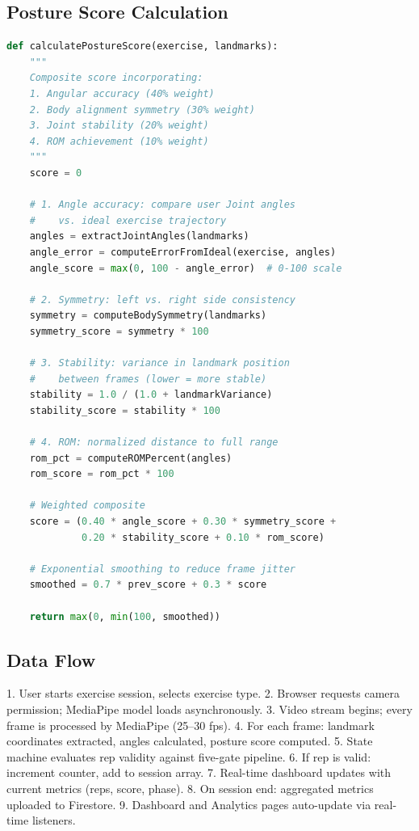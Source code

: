 \documentclass[12pt,a4paper]{article}
\begin{document}
\subsection{Posture Score Calculation}

\begin{lstlisting}[language=Python, caption={Posture score multi-factor algorithm}]
def calculatePostureScore(exercise, landmarks):
    """
    Composite score incorporating:
    1. Angular accuracy (40% weight)
    2. Body alignment symmetry (30% weight)  
    3. Joint stability (20% weight)
    4. ROM achievement (10% weight)
    """
    score = 0
    
    # 1. Angle accuracy: compare user Joint angles 
    #    vs. ideal exercise trajectory
    angles = extractJointAngles(landmarks)
    angle_error = computeErrorFromIdeal(exercise, angles)
    angle_score = max(0, 100 - angle_error)  # 0-100 scale
    
    # 2. Symmetry: left vs. right side consistency
    symmetry = computeBodySymmetry(landmarks)
    symmetry_score = symmetry * 100
    
    # 3. Stability: variance in landmark position 
    #    between frames (lower = more stable)
    stability = 1.0 / (1.0 + landmarkVariance)
    stability_score = stability * 100
    
    # 4. ROM: normalized distance to full range
    rom_pct = computeROMPercent(angles)
    rom_score = rom_pct * 100
    
    # Weighted composite
    score = (0.40 * angle_score + 0.30 * symmetry_score + 
             0.20 * stability_score + 0.10 * rom_score)
    
    # Exponential smoothing to reduce frame jitter
    smoothed = 0.7 * prev_score + 0.3 * score
    
    return max(0, min(100, smoothed))
\end{lstlisting}

\subsection{Data Flow}

\begin{enumerate}[noitemsep, topsep=2pt]
  1. User starts exercise session, selects exercise type.
  2. Browser requests camera permission; MediaPipe model loads asynchronously.
  3. Video stream begins; every frame is processed by MediaPipe (25--30 fps).
  4. For each frame: landmark coordinates extracted, angles calculated, posture 
     score computed.
  5. State machine evaluates rep validity against five-gate pipeline.
  6. If rep is valid: increment counter, add to session array.
  7. Real-time dashboard updates with current metrics (reps, score, phase).
  8. On session end: aggregated metrics uploaded to Firestore.
  9. Dashboard and Analytics pages auto-update via real-time listeners.
\end{enumerate}
\end{document}
